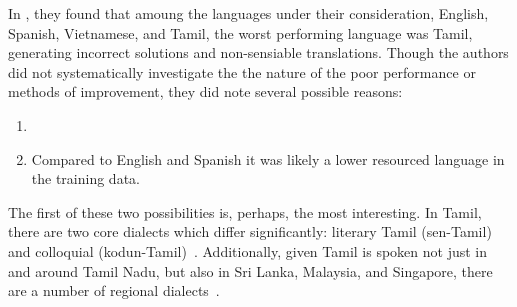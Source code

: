 



In \citet{jordan2024need}, they found that amoung the languages under their
consideration, English, Spanish, Vietnamese, and Tamil, the worst performing
language was Tamil, generating incorrect solutions and non-sensiable
translations. Though the authors did not systematically investigate the the
nature of the poor performance or methods of improvement, they did note several
possible reasons:
\begin{enumerate}
  \item 
  \item Compared to English and Spanish it was likely a lower resourced language
    in the training data.
\end{enumerate}
The first of these two possibilities is, perhaps, the most interesting. In
Tamil, there are two core dialects which differ significantly: literary Tamil
(sen-Tamil) and colloquial (kodun-Tamil)~\cite{}. Additionally, given Tamil is
spoken not just in and around Tamil Nadu, but also in Sri Lanka, Malaysia, and
Singapore, there are a number of regional dialects~\cite{}. 
